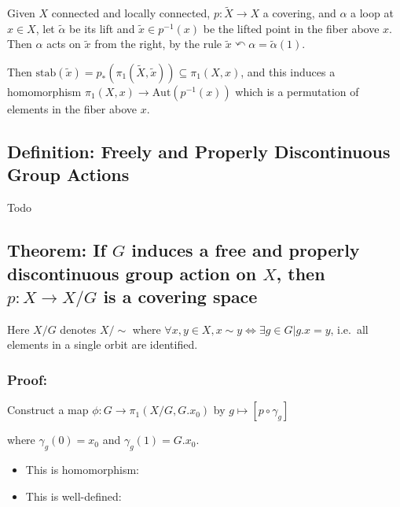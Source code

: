 Given \(X\) connected and locally connected, \(p:\tilde X \to X\) a
covering, and \(\alpha\) a loop at \(x\in X\), let \(\tilde \alpha\) be
its lift and \(\tilde x\in p^{-1}(x)\) be the lifted point in the fiber
above \(x\). Then \(\alpha\) acts on \(\tilde x\) from the right, by the
rule \(\tilde x \curvearrowleft \alpha = \tilde\alpha(1)\).

Then
\(\text{stab}(\tilde x) = p_*(\pi_1(\tilde X, \tilde x)) \subseteq \pi_1(X, x)\),
and this induces a homomorphism \(\pi_1(X, x) \to\text{Aut}(p^{-1}(x))\)
which is a permutation of elements in the fiber above \(x\).

\hypertarget{definition-freely-and-properly-discontinuous-group-actions}{%
\subsection{Definition: Freely and Properly Discontinuous Group
Actions}\label{definition-freely-and-properly-discontinuous-group-actions}}

Todo

\hypertarget{theorem-if-g-induces-a-free-and-properly-discontinuous-group-action-on-x-then-p-x-rightarrow-xg-is-a-covering-space}{%
\subsection{\texorpdfstring{Theorem: If \(G\) induces a free and
properly discontinuous group action on \(X\), then
\(p: X \rightarrow X/G\) is a covering
space}{Theorem: If G induces a free and properly discontinuous group action on X, then p: X \textbackslash rightarrow X/G is a covering space}}\label{theorem-if-g-induces-a-free-and-properly-discontinuous-group-action-on-x-then-p-x-rightarrow-xg-is-a-covering-space}}

Here \(X/G\) denotes \(X/\sim\) where
\(\forall x,y\in X, x\sim y \iff \exists g\in G \mathrel{\Big|}g.x = y\),
i.e.~all elements in a single orbit are identified.

\hypertarget{proof}{%
\subsubsection{Proof:}\label{proof}}

Construct a map \(\phi: G \rightarrow \pi_1(X/G, G.x_0)\) by
\(g \mapsto [p \circ \gamma_g]\)

where \(\gamma_g(0) = x_0\) and \(\gamma_g(1) = G.x_0\).

\begin{itemize}
\tightlist
\item
  This is homomorphism:
\item
  This is well-defined:
\end{itemize}

